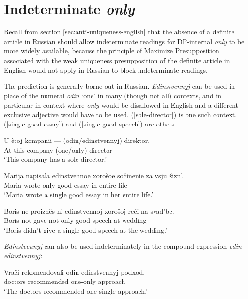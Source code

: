 \section{Indeterminate \textit{only} \label{sec:indeterminate-only}}

Recall from section \ref{sec:anti-uniqueness-english} that the absence of a definite article in Russian should allow indeterminate readings for DP-internal \textit{only} to be more widely available, because the principle of Maximize Presupposition associated with the weak uniqueness presupposition of the definite article in English would not apply in Russian to block indeterminate readings.

The prediction is generally borne out in Russian. \textit{Edinstvennyj} can be used in place of the numeral \textit{odin} `one' in many (though not all) contexts, and in particular in context where \textit{only} would be disallowed in English and a different exclusive adjective would have to be used. (\ref{sole-director}) is one such context. (\ref{single-good-essay}) and (\ref{single-good-speech}) are others.

\begin{exe}
	\ex \label{sole-director} \gll U \`{e}toj kompanii --- (odin/edinstvennyj) direktor.\\
	At this company {} (one/only) director\\
	\glt `This company has a sole director.'

	\ex \label{single-good-essay} \gll Marija napisala edinstvennoe xoro\v{s}oe so\v{c}inenie za vsju \v{z}izn'.\\
	Maria wrote only good essay in entire life\\
	\glt `Maria wrote a single good essay in her entire life.'

	\ex \label{single-good-speech} \gll Boris ne proizn\"{e}s ni edinstvennoj xoro\v{s}oj re\v{c}i na svad'be.\\
	Boris not gave not only good speech at wedding\\
	\glt `Boris didn't give a single good speech at the wedding.'
\end{exe}

\textit{Edinstvennyj} can also be used indeterminately in the compound expression \textit{odin-edinstvennyj}:

\begin{exe}
	\ex \label{odin-edinstvennyj} \gll Vra\v{c}i rekomendovali odin-edinstvennyj podxod.\\
	doctors recommended one-only approach\\
	`The doctors recommended one single approach.'
\end{exe}


